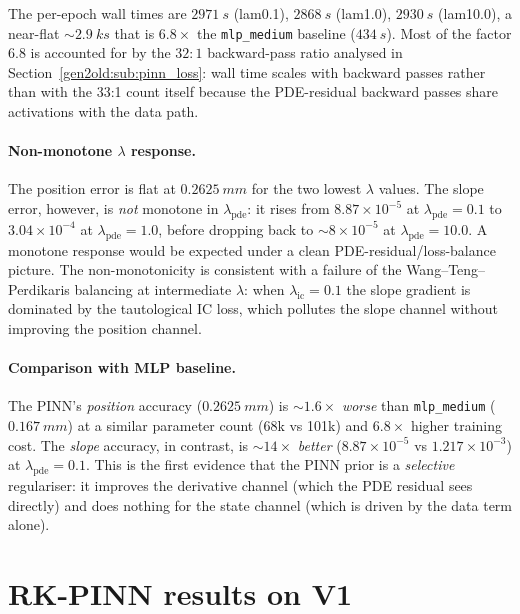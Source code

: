 \documentclass[a4paper,11pt]{article}
\newcommand{\SI}[2]{#1~#2}
\begin{document}
The per-epoch wall times are $\SI{2971}{s}$ (lam0.1), $\SI{2868}{s}$
(lam1.0), $\SI{2930}{s}$ (lam10.0), a near-flat $\sim\SI{2.9}{ks}$ that is
$\mathbf{6.8\times}$ the \texttt{mlp\_medium} baseline ($\SI{434}{s}$).
Most of the factor 6.8 is accounted for by the $32{:}1$ backward-pass
ratio analysed in Section~\ref{gen2old:sub:pinn_loss}: wall time scales
with backward passes rather than with the 33:1 count itself because the
PDE-residual backward passes share activations with the data path.

\paragraph{Non-monotone $\lambda$ response.}
The position error is flat at $\SI{0.2625}{mm}$ for the two lowest
$\lambda$ values. The slope error, however, is \emph{not} monotone in
$\lambda_{\mathrm{pde}}$: it rises from $8.87\!\times\!10^{-5}$ at
$\lambda_{\mathrm{pde}}=0.1$ to $3.04\!\times\!10^{-4}$ at
$\lambda_{\mathrm{pde}}=1.0$, before dropping back to
$\sim\!8\!\times\!10^{-5}$ at $\lambda_{\mathrm{pde}}=10.0$. A monotone
response would be expected under a clean PDE-residual/loss-balance picture.
The non-monotonicity is consistent with a failure of the
Wang--Teng--Perdikaris balancing at intermediate $\lambda$: when
$\lambda_{\mathrm{ic}}=0.1$ the slope gradient is dominated by the
tautological IC loss, which pollutes the slope channel without improving
the position channel.

\paragraph{Comparison with MLP baseline.}
The PINN's \emph{position} accuracy ($\SI{0.2625}{mm}$) is
$\sim\!1.6\times$ \emph{worse} than \texttt{mlp\_medium} ($\SI{0.167}{mm}$)
at a similar parameter count (68k vs 101k) and $6.8\times$ higher training
cost. The \emph{slope} accuracy, in contrast, is $\sim\!14\times$
\emph{better} ($8.87\!\times\!10^{-5}$ vs $1.217\!\times\!10^{-3}$) at
$\lambda_{\mathrm{pde}}=0.1$. This is the first evidence that the PINN
prior is a \emph{selective} regulariser: it improves the derivative
channel (which the PDE residual sees directly) and does nothing for the
state channel (which is driven by the data term alone).

\section{RK-PINN results on V1}\label{gen2old:sec:rkpinn}
\end{document}
